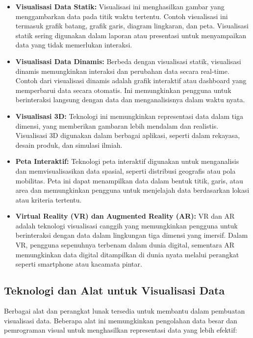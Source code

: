 \begin{itemize}
    \item \textbf{Visualisasi Data Statik:} Visualisasi ini menghasilkan gambar yang menggambarkan data pada titik waktu tertentu. Contoh visualisasi ini termasuk grafik batang, grafik garis, diagram lingkaran, dan peta. Visualisasi statik sering digunakan dalam laporan atau presentasi untuk menyampaikan data yang tidak memerlukan interaksi.
    \item \textbf{Visualisasi Data Dinamis:} Berbeda dengan visualisasi statik, visualisasi dinamis memungkinkan interaksi dan perubahan data secara real-time. Contoh dari visualisasi dinamis adalah grafik interaktif atau dashboard yang memperbarui data secara otomatis. Ini memungkinkan pengguna untuk berinteraksi langsung dengan data dan menganalisisnya dalam waktu nyata.
    \item \textbf{Visualisasi 3D:} Teknologi ini memungkinkan representasi data dalam tiga dimensi, yang memberikan gambaran lebih mendalam dan realistis. Visualisasi 3D digunakan dalam berbagai aplikasi, seperti dalam rekayasa, desain produk, dan simulasi ilmiah.
    \item \textbf{Peta Interaktif:} Teknologi peta interaktif digunakan untuk menganalisis dan memvisualisasikan data spasial, seperti distribusi geografis atau pola mobilitas. Peta ini dapat menampilkan data dalam bentuk titik, garis, atau area dan memungkinkan pengguna untuk menjelajah data berdasarkan lokasi atau kriteria tertentu.
    \item \textbf{Virtual Reality (VR) dan Augmented Reality (AR):} VR dan AR adalah teknologi visualisasi canggih yang memungkinkan pengguna untuk berinteraksi dengan data dalam lingkungan tiga dimensi yang imersif. Dalam VR, pengguna sepenuhnya terbenam dalam dunia digital, sementara AR memungkinkan data digital ditampilkan di dunia nyata melalui perangkat seperti smartphone atau kacamata pintar.
\end{itemize}

\subsection{Teknologi dan Alat untuk Visualisasi Data}
\label{subsec:alat_visualisasi}

Berbagai alat dan perangkat lunak tersedia untuk membantu dalam pembuatan visualisasi data. Beberapa alat ini memungkinkan pengolahan data besar dan pemrograman visual untuk menghasilkan representasi data yang lebih efektif:

